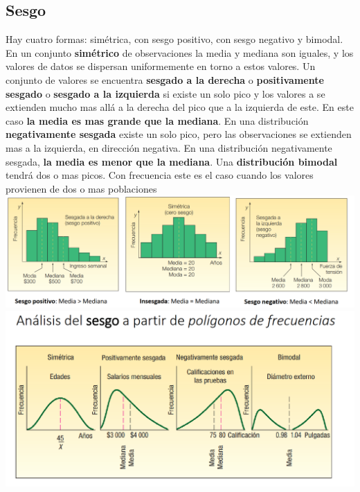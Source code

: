 \documentclass[]{article}
\begin{document}
\subsection{Sesgo}
Hay cuatro formas: simétrica, con sesgo positivo, con sesgo negativo y bimodal. En un conjunto \textbf{simétrico} de observaciones la media y mediana son iguales, y los valores de datos se dispersan uniformemente en torno a estos valores. Un conjunto de valores se encuentra \textbf{sesgado a la derecha} o \textbf{positivamente sesgado} o \textbf{sesgado a la izquierda} si existe un solo pico y los valores a se extienden mucho mas allá a la derecha del pico que a la izquierda de este. En este caso \textbf{la media es mas grande que la mediana}. En una distribución \textbf{negativamente sesgada} existe un solo pico, pero las observaciones se extienden mas a la izquierda, en dirección negativa. En una distribución negativamente sesgada, \textbf{la media es menor que la mediana}. Una \textbf{distribución bimodal} tendrá dos o mas picos. Con frecuencia este es el caso cuando los valores provienen de dos o mas poblaciones
\includegraphics[width=14cm]{imagenes/SesgosCap4.PNG}
\includegraphics[width=14cm]{imagenes/SesgosCap4ConCurvas.PNG}
\end{document}
